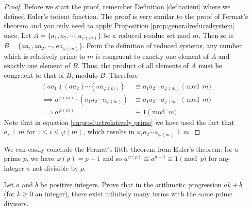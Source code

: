 \documentclass{subfile}
\begin{document}
		\begin{proof}
			Before we start the proof, remember Definition \ref{def:totient} where we defined Euler's totient function. The proof is very similar to the proof of Fermat's theorem and you only need to apply Proposition \ref{prop:generalreducedsystem} once. Let $A=\{a_1, a_2, \cdots, a_{\varphi(m)}\}$ be a reduced residue set mod $m$. Then so is $B=\{aa_1, aa_2, \cdots, aa_{\varphi(m)}\}$. From the definition of reduced systems, any number which is relatively prime to $m$ is congruent to exactly one element of $A$ and exactly one element of $B$. Thus, the product of all elements of $A$ must be congruent to that of $B$, modulo $B$. Therefore
			\begin{align}
				(aa_1) (aa_2) \cdots (aa_{\varphi(m)})
					&\equiv a_1 a_2 \cdots a_{\varphi(m)}\pmod m\nonumber\\
			\implies a^{\varphi(m)} \cdot \left( a_1 a_2 \cdots a_{\varphi(m)}\right)
				& \equiv a_1 a_2 \cdots a_{\varphi(m)} \pmod m\nonumber\\\label{eq:productrelatively prime}
			\implies a^{\varphi(m)}
				&\equiv 1\pmod m
			\end{align}
			Note that in equation \eqref{eq:productrelatively prime} we have used the fact that $a_i \perp m$ for $1 \leq i \leq \varphi(m)$, which results in $a_1 a_2 \cdots a_{\varphi(m)} \perp m$.
		\end{proof}
	We can easily conclude the Fermat's little theorem from Euler's theorem: for a prime $p$, we have $\varphi(p)=p-1$ and so $a^{\varphi(p)} \equiv a^{p-1} \equiv 1 \pmod p$ for any integer $a$ not divisible by $p$.
		\begin{problem}
			Let $a$ and $b$ be positive integers. Prove that in the arithmetic progression $ak+b$ (for $k \geq 0$ an integer), there exist infinitely many terms with the same prime divisors.
		\end{problem}
\end{document}
